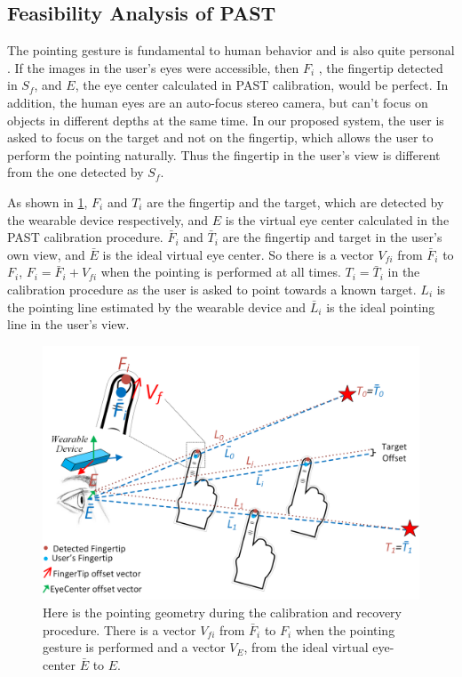 \subsection{Feasibility Analysis of PAST} \label{sec:4-PAST:FA}
The pointing gesture is fundamental to human behavior and is also quite personal \cite{Matthews2012}. If the images in the user's eyes were accessible, then $F_i$ , the fingertip detected in $S_f$, and $E$, the eye center calculated in PAST calibration, would be perfect. In addition, the human eyes are an auto-focus stereo camera, but can't focus on objects in different depths at the same time. In our proposed system, the user is asked to focus on the target and not on the fingertip, which allows the user to perform the pointing naturally. Thus the fingertip in the user's view is different from the one detected by $S_f$. 

As shown in \figurename{ \ref{fig:4-PAST:fingertipOffset}}, $F_i$  and $T_i$  are the fingertip and the target, which are detected by the wearable device respectively, and $E$ is the virtual eye center calculated in the PAST calibration procedure. $\bar F_i$ and $\bar T_i$ are the fingertip and target in the user{\rq}s own view, and $\bar E$ is the ideal virtual eye center. So there is a vector $V_{fi}$ from $\bar F_i$ to $F_i$, $F_i = {\bar F_i} + V_{fi}$ when the pointing is performed at all times. $T_i = {\bar T_i}$ in the calibration procedure as the user is asked to point towards a known target. $L_i$ is the pointing line estimated by the wearable device and $\bar L_i$ is the ideal pointing line in the user{\rq}s view. 
\begin{figure} [htb]
	\centering
	\includegraphics[width= \linewidth]{figures/4-PAST/fingerOffset.png}
	\caption{ Here is the pointing geometry during the calibration and recovery procedure. There is a vector $V_{fi}$  from $\bar F_i$ to $F_i$ when the pointing gesture is performed and a vector $V_{E}$, from the ideal virtual eye-center ${\bar E}$ to $E$.}
	\label{fig:4-PAST:fingertipOffset}
\end{figure}

